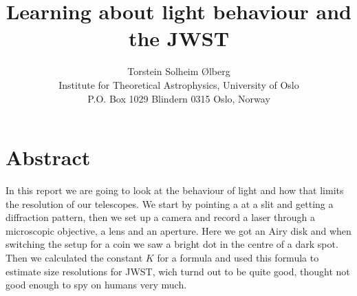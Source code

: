 \documentclass[11pt, A4paper, english]{article}
\author{Torstein Solheim Ølberg \\
Institute for Theoretical Astrophysics, University of Oslo \\
P.O. Box 1029 Blindern 0315 Oslo, Norway}
\title{Learning about light behaviour and the JWST}
\begin{document}
\maketitle

	\section{Abstract}
In this report we are going to look at the behaviour of light and how that limits the resolution of our telescopes. We start by pointing a at a slit and getting a diffraction pattern, then we set up a camera and record a laser through a microscopic objective, a lens and an aperture. Here we got an Airy disk and when switching the setup for a coin we saw a bright dot in the centre of a dark spot. Then we calculated the constant $K$ for a formula and used this formula to estimate size resolutions for JWST, wich turnd out to be quite good, thought not good enough to spy on humans very much.
\end{document}
